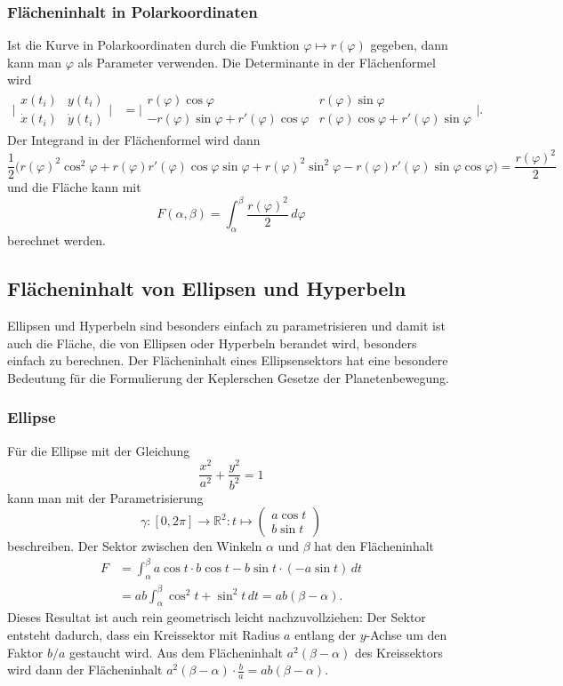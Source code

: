 %
%
\subsubsection{Flächeninhalt in Polarkoordinaten}
Ist die Kurve in Polarkoordinaten durch die Funktion
$\varphi\mapsto r(\varphi)$ gegeben, dann kann man $\varphi$ als
Parameter verwenden.
Die Determinante in der Flächenformel wird
\begin{align*}
\biggl|
\begin{matrix}
x(t_i)& y(t_i)\\
\dot{x}(t_i)& \dot{y}(t_i)
\end{matrix}
\biggr|
&=
\biggl|
\begin{matrix}
r(\varphi)\cos\varphi&r(\varphi)\sin\varphi\\
-r(\varphi)\sin\varphi+r'(\varphi)\cos\varphi
	&r(\varphi)\cos\varphi+r'(\varphi)\sin\varphi
\end{matrix}
\biggr|.
\end{align*}
Der Integrand in der Flächenformel wird dann
\[
\frac12\bigl(
r(\varphi)^2 \cos^2\varphi +r(\varphi)r'(\varphi)\cos\varphi\sin\varphi
+
r(\varphi)^2 \sin^2\varphi -r(\varphi)r'(\varphi)\sin\varphi\cos\varphi
\bigr)
=
\frac{r(\varphi)^2}2
\]
und die Fläche kann mit
\[
F(\alpha,\beta)=\int_\alpha^\beta \frac{r(\varphi)^2}{2}\,d\varphi
\]
berechnet werden.

%
%
\subsection{Flächeninhalt von Ellipsen und Hyperbeln}
Ellipsen und Hyperbeln sind besonders einfach zu parametrisieren und
damit ist auch die Fläche, die von Ellipsen oder Hyperbeln berandet
wird, besonders einfach zu berechnen.
Der Flächeninhalt eines Ellipsensektors hat eine besondere Bedeutung
für die Formulierung der Keplerschen Gesetze der Planetenbewegung.

%
%
\subsubsection{Ellipse}
Für die Ellipse mit der Gleichung
\[
\frac{x^2}{a^2}+\frac{y^2}{b^2}=1
\]
kann man mit der Parametrisierung
\[
\gamma\colon
[0,2\pi] \to \mathbb{R}^2
:
t \mapsto \begin{pmatrix}a\cos t\\ b\sin t\end{pmatrix}
\]
beschreiben.
Der Sektor zwischen den Winkeln $\alpha$ und $\beta$
hat den Flächeninhalt
\begin{align*}
F
&=
\int_\alpha^\beta a\cos t \cdot b\cos t-b\sin t\cdot (-a\sin t)\,dt
\\
&=
ab
\int_\alpha^\beta \cos^2 t + \sin^2 t\,dt
=ab(\beta-\alpha).
\end{align*}
Dieses Resultat ist auch rein geometrisch leicht nachzuvollziehen:
Der Sektor entsteht dadurch, dass ein Kreissektor mit Radius $a$
entlang der $y$-Achse um den Faktor $b/a$ gestaucht wird.
Aus dem Flächeninhalt $a^2(\beta-\alpha)$ des Kreissektors wird dann
der Flächeninhalt $a^2(\beta-\alpha)\cdot \frac{b}{a}=ab(\beta-\alpha)$.


